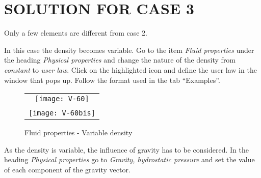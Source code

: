 %
%
%
%
%
%
%
\section{SOLUTION FOR CASE 3}

Only a few elements are different from case 2.

In this case the density becomes variable. Go to the item
{\itshape Fluid properties} under the heading
{\itshape Physical properties} and change the nature of the density from
{\itshape constant} to {\itshape user law}. Click on the highlighted icon and define the user law in the window that pops up. Follow the format used in the tab ``Examples''.

\begin{figure}[h!]
\begin{center}
\begin{tabular}{c}
\texttt{[image: V-60]} \\
\\
\texttt{[image: V-60bis]}
\end{tabular}
\caption{Fluid properties - Variable density}
\label{fig1_e3}
\end{center}
\end{figure}

\newpage
As the density is variable, the influence of gravity has to be considered. In the
heading {\itshape Physical properties} go to
{\itshape Gravity, hydrostatic pressure} and set the value of each component of
the gravity vector.

